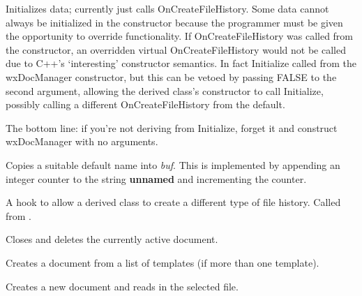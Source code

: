 \label{wxdocmanagerinitialize}


Initializes data; currently just calls OnCreateFileHistory. Some data cannot
always be initialized in the constructor because the programmer must be given
the opportunity to override functionality. If OnCreateFileHistory was called
from the constructor, an overridden virtual OnCreateFileHistory would not be
called due to C++'s `interesting' constructor semantics. In fact Initialize
 called from the wxDocManager constructor, but this can be
vetoed by passing FALSE to the second argument, allowing the derived class's
constructor to call Initialize, possibly calling a different OnCreateFileHistory
from the default.

The bottom line: if you're not deriving from Initialize, forget it and
construct wxDocManager with no arguments.



Copies a suitable default name into {\it buf}. This is implemented by
appending an integer counter to the string {\bf unnamed} and incrementing
the counter.



A hook to allow a derived class to create a different type of file history. Called
from .



Closes and deletes the currently active document.



Creates a document from a list of templates (if more than one template).



Creates a new document and reads in the selected file.


